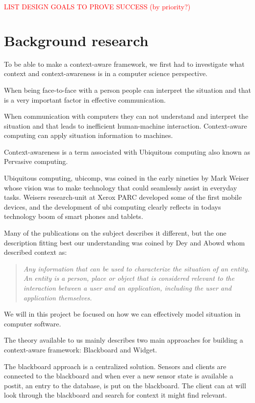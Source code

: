\documentclass[]{report}
\begin{document}
\textcolor{red}{LIST DESIGN GOALS TO PROVE SUCCESS (by priority?)}



\chapter{Background research}


To be able to make a context-aware framework, we first had to investigate what context and context-awareness is in a computer science perspective.


When being face-to-face with a person people can interpret the situation and that is a very important factor in effective communication. 

When communication with computers they can not understand and interpret the situation and that leads to inefficient human-machine interaction. Context-aware computing can apply situation information to machines.

Context-awareness is a term associated with Ubiquitous computing also known as Pervasive computing.

Ubiquitous computing, ubicomp, was coined in the early nineties by Mark Weiser whose vision was to make technology that could seamlessly assist in everyday tasks. Weisers research-unit at Xerox PARC developed some of the first mobile devices, and the development of ubi computing clearly reflects in todays technology boom of smart phones and tablets.

Many of the publications on the subject describes it different, but the one description fitting best our understanding was coined by Dey and Abowd whom described context as:


\blockquote{
	\textit{Any information that can be used to characterize the situation of an entity. An entity is a person, place or object that is considered relevant to the interaction between a user and an application, including the user and application themselves.} \cite{Dey and Abowd (2000)} 
}

We will in this project be focused on how we can effectively model situation in computer software.

The theory available to us mainly describes two main approaches for building a context-aware framework: Blackboard and Widget.


The blackboard approach is a centralized solution. Sensors and clients are connected to the blackboard and when ever a new sensor state is available a postit, an entry to the database, is put on the blackboard. The client can at will look through the blackboard and search for context it might find relevant.
\end{document}
